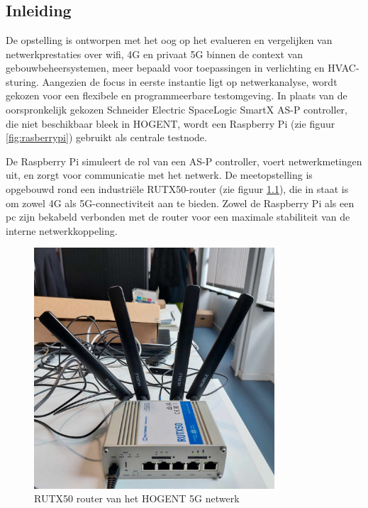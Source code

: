 \chapter{}%
\label{ch:basisopstelling}

\section{Inleiding}

De opstelling is ontworpen met het oog op het evalueren en vergelijken van netwerkprestaties over wifi, 4G en privaat 5G binnen de context van gebouwbeheersystemen, meer bepaald voor toepassingen in verlichting en HVAC-sturing.
Aangezien de focus in eerste instantie ligt op netwerkanalyse, wordt gekozen voor een flexibele en programmeerbare testomgeving. In plaats van de oorspronkelijk gekozen Schneider Electric SpaceLogic SmartX AS-P controller, die niet beschikbaar bleek in HOGENT, wordt een Raspberry Pi (zie figuur \ref{fig:rasberrypi}) gebruikt als centrale testnode.


De Raspberry Pi simuleert de rol van een AS-P controller, voert netwerkmetingen uit, en zorgt voor communicatie met het netwerk. De meetopstelling is opgebouwd rond een industriële RUTX50-router (zie figuur \ref{fig:router}), die in staat is om zowel 4G als 5G-connectiviteit aan te bieden. Zowel de Raspberry Pi als een pc zijn bekabeld verbonden met de router voor een maximale stabiliteit van de interne netwerkkoppeling.

\begin{figure}
    \includegraphics[width=0.8\textwidth]{../graphics/RUTX50.jpg}
    \caption[RUTX50 router van het HOGENT 5G netwerk]{\label{fig:router}RUTX50 router van het HOGENT 5G netwerk}
\end{figure}

